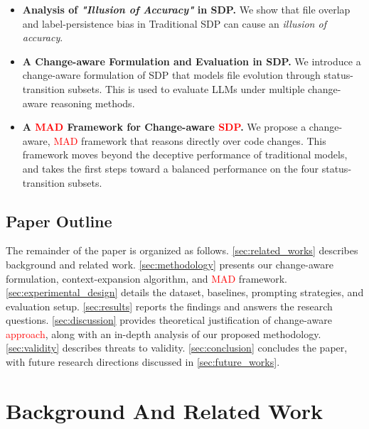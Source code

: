 \documentclass[authoryear,final,5p,times,twocolumn]{elsarticle}
\theoremstyle{plain}
\begin{document}
\begin{itemize}
    \item \textbf{Analysis of \emph{"Illusion of Accuracy"} in SDP.}
    We 
    show that file overlap and label-persistence bias in Traditional SDP can cause an \emph{illusion of accuracy}.
    \item \textbf{A Change-aware Formulation and Evaluation in SDP.}
    We introduce a change-aware formulation of SDP that models file evolution through status-transition subsets. 
    This is used to evaluate LLMs under multiple change-aware reasoning methods.
    \item \textbf{A \textcolor{red}{MAD} Framework for Change-aware \textcolor{red}{SDP}.}
    We propose a change-aware, \textcolor{red}{MAD} framework that reasons directly over code changes. 
    This framework moves beyond the deceptive performance of traditional models, and takes the first steps toward a balanced performance on the four status-transition subsets. 
\end{itemize}

\subsection{Paper Outline}
The remainder of the paper is organized as follows. \autoref{sec:related_works} describes background and related work. \autoref{sec:methodology} presents our change-aware formulation, context-expansion algorithm, and \textcolor{red}{MAD} framework. \autoref{sec:experimental_design} details the dataset, baselines, prompting strategies, and evaluation setup. \autoref{sec:results} reports the findings and answers the research questions. \autoref{sec:discussion} provides theoretical justification of change-aware \textcolor{red}{approach}, along with an in-depth analysis of our proposed methodology. \autoref{sec:validity} describes threats to validity. \autoref{sec:conclusion} concludes the paper, with future research directions discussed in \autoref{sec:future_works}.

\section{‌Background And Related Work}
\label{sec:related_works}
\end{document}
